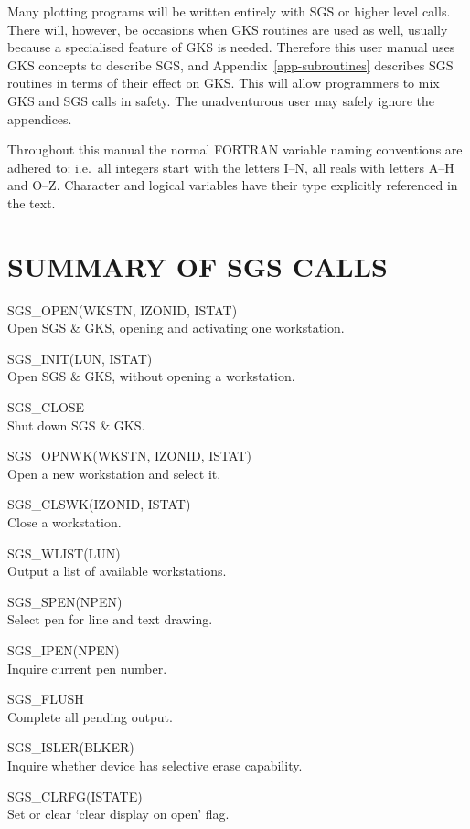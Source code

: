 \documentclass[11pt]{article}
\newcommand{\hyperref}[4]{#2\ref{#4}#3}
\newcommand{\htmlref}[2]{#1}
\newcommand{\routinehead}[1]{\vspace{\bigskipamount}{\large\bf#1}}
\newenvironment{routinelist}{\begin{list}{}{\setlength{\leftmargin}{2cm}
                             \setlength{\parsep}{\smallskipamount}}}{\end{list}}
\newcommand{\routine}[2]{\item\hspace{-1cm}#1#2\\}
\newcommand{\routinehead}[1]{\subsection{#1}}
\newcommand{\routine}[2]{\item \htmlref{#1}{#1}#2\\}
\begin{document}
Many plotting programs will be written entirely with SGS or higher level calls.
There will, however, be occasions when GKS routines are used as well, usually
because a specialised feature of GKS is needed. Therefore this user manual uses
GKS concepts to describe SGS, and 
\hyperref{this appendix}{Appendix~}{}{app-subroutines} describes SGS
routines in terms of their effect on GKS. This will allow programmers to mix
GKS and SGS calls in safety. The unadventurous user may safely ignore the
appendices.
 
Throughout this manual the normal FORTRAN variable naming conventions are
adhered to:  i.e.\ all integers start with the letters I--N, all reals with
letters A--H and O--Z. Character and logical variables have their type
explicitly referenced in the text.


\section{SUMMARY OF SGS CALLS}\label{sec-summary}

\routinehead{Control}
\begin{routinelist}
\routine {SGS\_OPEN}{(WKSTN, IZONID, ISTAT)}
   Open SGS \& GKS, opening and activating one workstation.
\routine {SGS\_INIT}{(LUN, ISTAT)} 
   Open SGS \& GKS, without opening a workstation.
\routine {SGS\_CLOSE}{}
   Shut down SGS \& GKS.
\routine {SGS\_OPNWK}{(WKSTN, IZONID, ISTAT)} 
   Open a new workstation and select it.
\routine {SGS\_CLSWK}{(IZONID, ISTAT)} 
   Close a workstation.
\routine {SGS\_WLIST}{(LUN)} 
   Output a list of available workstations.
\routine {SGS\_SPEN}{(NPEN)} 
   Select pen for line and text drawing.
\routine {SGS\_IPEN}{(NPEN)} 
   Inquire current pen number.
\routine {SGS\_FLUSH}{}
   Complete all pending output.
\routine {SGS\_ISLER}{(BLKER)} 
   Inquire whether device has selective erase capability.
\routine {SGS\_CLRFG}{(ISTATE)} 
   Set or clear `clear display on open' flag.
\end{routinelist}
\end{document}
